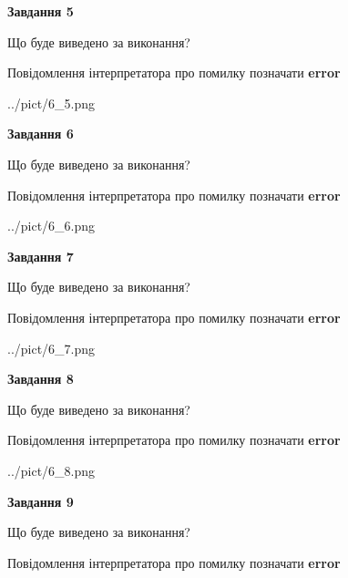 \documentclass[11pt, ukrainian]{article}
\begin{document}
{\begin {large}
{\begin {center}\textbf{Завдання 5}\end {center}}\par
Що буде виведено за виконання? \par
Повідомлення інтерпретатора про помилку позначати \textbf{error}

\begin{center}
	{../pict/6_5.png}
\end{center}
\newpage

{\begin {center}\textbf{Завдання 6}\end {center}}\par
Що буде виведено за виконання? \par
Повідомлення інтерпретатора про помилку позначати \textbf{error}

\begin{center}
	{../pict/6_6.png}
\end{center}
\newpage

{\begin {center}\textbf{Завдання 7}\end {center}}\par
Що буде виведено за виконання? \par
Повідомлення інтерпретатора про помилку позначати \textbf{error}

\begin{center}
	{../pict/6_7.png}
\end{center}
\newpage

{\begin {center}\textbf{Завдання 8}\end {center}}\par
Що буде виведено за виконання? \par
Повідомлення інтерпретатора про помилку позначати \textbf{error}

\begin{center}
	{../pict/6_8.png}
\end{center}
\newpage

{\begin {center}\textbf{Завдання 9}\end {center}}\par
Що буде виведено за виконання? \par
Повідомлення інтерпретатора про помилку позначати \textbf{error}


\end{large}}
\end{document}
